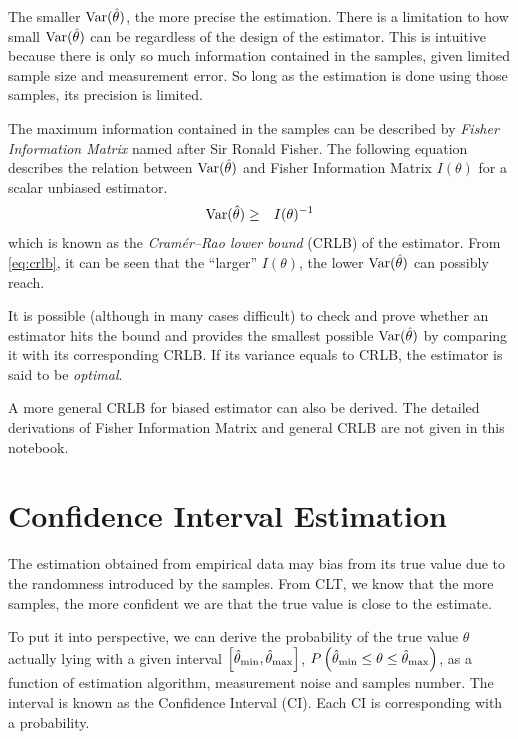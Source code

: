 The smaller $\textup{Var}(\hat{\theta})$, the more precise the estimation. There is a limitation to how small $\textup{Var}(\hat{\theta})$ can be regardless of the design of the estimator. This is intuitive because there is only so much information contained in the samples, given limited sample size and measurement error. So long as the estimation is done using those samples, its precision is limited. 

The maximum information contained in the samples can be described by \textit{Fisher Information Matrix} named after Sir Ronald Fisher. The following equation describes the relation between $\textup{Var}(\hat{\theta})$ and Fisher Information Matrix $I(\theta)$ for a scalar unbiased estimator.
\begin{eqnarray}
	\textup{Var}(\hat{\theta}) &\geq& I(\theta)^{-1} \label{eq:crlb}
\end{eqnarray}
which is known as the \textit{Cram\'{e}r–Rao lower bound} (CRLB) of the estimator. From \eqref{eq:crlb}, it can be seen that the ``larger'' $I(\theta)$, the lower $\textup{Var}(\hat{\theta})$  can possibly reach.

It is possible (although in many cases difficult) to check and prove whether an estimator hits the bound and provides the smallest possible $\textup{Var}(\hat{\theta})$ by comparing it with its corresponding CRLB. If its variance equals to CRLB, the estimator is said to be \textit{optimal}.

A more general CRLB for biased estimator can also be derived. The detailed derivations of Fisher Information Matrix and general CRLB are not given in this notebook.

\section{Confidence Interval Estimation}

The estimation obtained from empirical data may bias from its true value due to the randomness introduced by the samples. From CLT, we know that the more samples, the more confident we are that the true value is close to the estimate. 

To put it into perspective, we can derive the probability of the true value $\theta$ actually lying with a given interval $\left[\hat{\theta}_{\textup{min}},\hat{\theta}_{\textup{max}}\right]$, $P\left(\hat{\theta}_{\textup{min}} \leq \theta \leq \hat{\theta}_{\textup{max}}\right)$, as a function of estimation algorithm, measurement noise and samples number. The interval is known as the Confidence Interval (CI). Each CI is corresponding with a probability.

